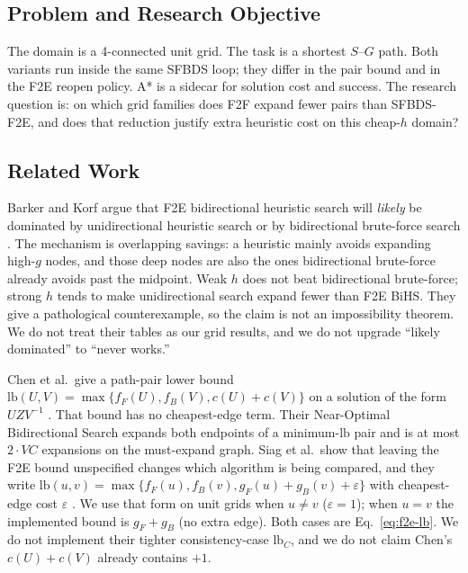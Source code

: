 \subsection{Problem and Research Objective}

The domain is a 4-connected unit grid. The task is a shortest \(S\)--\(G\) path. Both variants run inside the same SFBDS loop; they differ in the pair bound and in the F2E reopen policy. A* is a sidecar for solution cost and success. The research question is: on which grid families does F2F expand fewer pairs than SFBDS-F2E, and does that reduction justify extra heuristic cost on this cheap-\(h\) domain?

\subsection{Related Work}

Barker and Korf argue that F2E bidirectional heuristic search will \emph{likely} be dominated by unidirectional heuristic search or by bidirectional brute-force search \cite{barker2015f2e}. The mechanism is overlapping savings: a heuristic mainly avoids expanding high-\(g\) nodes, and those deep nodes are also the ones bidirectional brute-force already avoids past the midpoint. Weak \(h\) does not beat bidirectional brute-force; strong \(h\) tends to make unidirectional search expand fewer than F2E BiHS. They give a pathological counterexample, so the claim is not an impossibility theorem. We do not treat their tables as our grid results, and we do not upgrade ``likely dominated'' to ``never works.''

Chen et al.\ give a path-pair lower bound \(\mathrm{lb}(U,V)=\max\{f_F(U),f_B(V),c(U)+c(V)\}\) on a solution of the form \(U Z V^{-1}\) \cite{chen2017nbs}. That bound has no cheapest-edge term. Their Near-Optimal Bidirectional Search expands both endpoints of a minimum-\(\mathrm{lb}\) pair and is at most \(2\cdot VC\) expansions on the must-expand graph. Siag et al.\ show that leaving the F2E bound unspecified changes which algorithm is being compared, and they write \(\mathrm{lb}(u,v)=\max\{f_F(u),f_B(v),g_F(u)+g_B(v)+\varepsilon\}\) with cheapest-edge cost \(\varepsilon\) \cite{siag2023ijcai}. We use that form on unit grids when \(u\neq v\) (\(\varepsilon=1\)); when \(u=v\) the implemented bound is \(g_F+g_B\) (no extra edge). Both cases are Eq.~\eqref{eq:f2e-lb}. We do not implement their tighter consistency-case \(\mathrm{lb}_C\), and we do not claim Chen's \(c(U)+c(V)\) already contains \(+1\).

